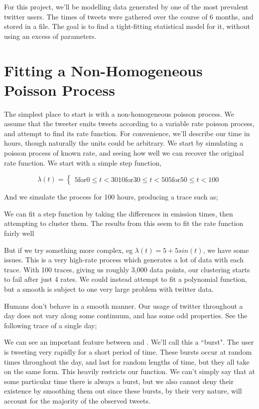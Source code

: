 For this project, we'll be modelling data generated by one of the most prevalent twitter users. The times of tweets were gathered over the course of 6 months, and stored in a file. The goal is to find a tight-fitting statistical model for it, without using an excess of parameters.


\section{Fitting a Non-Homogeneous Poisson Process}

The simplest place to start is with a non-homogeneous poisson process. We assume that the tweeter emits tweets according to a variable rate poisson process, and attempt to find its rate function. For convenience, we'll describe our time in hours, though naturally the units could be arbitrary. We start by simulating a poisson process of known rate, and seeing how well we can recover the original rate function. We start with a simple step function,

$$
\lambda(t) = 
\begin{cases}
5  \mbox{for} 0  \leqslant t < 30
10 \mbox{for} 30 \leqslant t < 50
5  \mbox{for} 50 \leqslant t < 100
\end{cases}
$$

And we simulate the process for 100 hours, producing a trace such as;


We can fit a step function by taking the differences in emission times, then attempting to cluster them. The results from this seem to fit the rate function fairly well


But if we try something more complex, eg $\lambda(t) = 5+5sin(t)$, we have some issues. This is a very high-rate process which generates a lot of data with each trace. With 100 traces, giving us roughly 3,000 data points, our clustering starts to fail after just 4 rates. We could instead attempt to fit a polynomial function, but a smooth is subject to one very large problem with twitter data.

Humans don't behave in a smooth manner. Our usage of twitter throughout a day does not vary along some continuum, and has some odd properties. See the following trace of a single day;


We can see an important feature between 
and
. We'll call this a ``burst". The user is tweeting very rapidly for a short period of time. These bursts occur at random times throughout the day, and last for random lengths of time, but they all take on the same form. This heavily restricts our function. We can't simply say that at some particular time there is always a burst, but we also cannot deny their existence by smoothing them out since these bursts, by their very nature, will account for the majority of the observed tweets.

